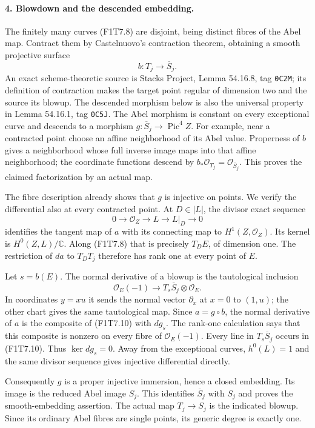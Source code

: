 \paragraph{4. Blowdown and the descended embedding.}
The finitely many curves (F1T7.8) are disjoint, being distinct
fibres of the Abel map. Contract them by Castelnuovo's
contraction theorem, obtaining a smooth projective surface
\[
                         b:T_j\longrightarrow \overline S_j.
\]
An exact scheme-theoretic source is Stacks Project,
Lemma 54.16.8, tag \texttt{0C2M}; its definition of
contraction makes the target point regular of dimension two
and the source its blowup. The descended morphism below is
also the universal property in Lemma 54.16.1,
tag \texttt{0C5J}.
The Abel morphism is constant on every exceptional curve
and descends to a morphism
$g:\overline S_j\to\operatorname{Pic}^4Z$.
For example, near a contracted point choose an affine
neighborhood of its Abel value. Properness of $b$ gives
a neighborhood whose full inverse image maps into that
affine neighborhood; the coordinate functions descend
by $b_*\mathcal O_{T_j}=\mathcal O_{\overline S_j}$.
This proves the claimed factorization by an actual map.

The fibre description already shows that $g$ is injective
on points. We verify the differential also at every
contracted point. At $D\in|L|$, the divisor exact sequence
\[
0\longrightarrow\mathcal O_Z\longrightarrow L
 \longrightarrow L|_D\longrightarrow0
\]
identifies the tangent map of $a$ with its connecting map
to $H^1(Z,\mathcal O_Z)$. Its kernel is
$H^0(Z,L)/\mathbb C$. Along (F1T7.8) that is precisely
$T_DE$, of dimension one. The restriction of $da$ to
$T_DT_j$ therefore has rank one at every point of $E$.

Let $s=b(E)$. The normal derivative of a blowup is the
tautological inclusion
\[
 \mathcal O_E(-1)\longrightarrow
                     T_s\overline S_j\otimes\mathcal O_E.
 \tag{F1T7.10}
\]
In coordinates $y=xu$ it sends the normal vector
$\partial_x$ at $x=0$ to $(1,u)$; the other chart gives
the same tautological map. Since $a=g\circ b$, the
normal derivative of $a$ is the composite of (F1T7.10)
with $dg_s$. The rank-one calculation says that this
composite is nonzero on every fibre of $\mathcal O_E(-1)$.
Every line in $T_s\overline S_j$ occurs in (F1T7.10).
Thus $\ker dg_s=0$. Away from the exceptional curves,
$h^0(L)=1$ and the same divisor sequence gives injective
differential directly.

Consequently $g$ is a proper injective immersion, hence
a closed embedding. Its image is the reduced Abel
image $S_j$. This identifies $\overline S_j$ with
$S_j$ and proves the smooth-embedding assertion.
The actual map $T_j\to S_j$ is the indicated blowup.
Since its ordinary Abel fibres are single points,
its generic degree is exactly one.

